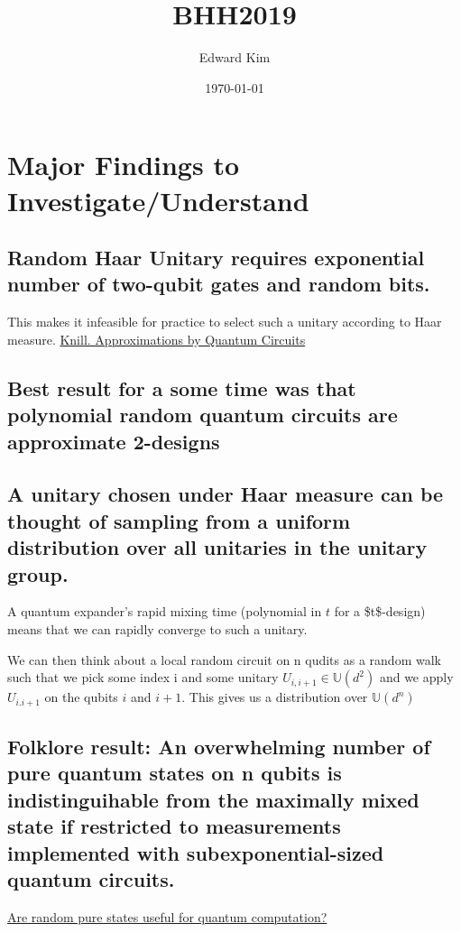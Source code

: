 \documentclass[11pt]{article}
\author{Edward Kim}
\date{\today}
\title{BHH2019}
\begin{document}
\maketitle
\tableofcontents


\section{Major Findings to Investigate/Understand}
\label{sec:org9e50a7b}
\subsection{Random Haar Unitary requires exponential number of two-qubit gates and random bits.}
\label{sec:org82a1496}
This makes it infeasible for practice to select such a unitary according to Haar measure.
\href{https://arxiv.org/pdf/quant-ph/9508006.pdf}{Knill. Approximations by Quantum Circuits}

\subsection{Best result for a some time was that polynomial random quantum circuits are approximate 2-designs}
\label{sec:orge6ed15b}
\subsection{A unitary chosen under Haar measure can be thought of sampling from a uniform distribution over all unitaries in the unitary group.}
\label{sec:org549b286}
A quantum expander's rapid mixing time (polynomial in \(t\) for a \$t\$-design) means that we can rapidly converge to such a unitary.

We can then think about a local random circuit on n qudits as a random walk such that we pick some index i and some unitary \(U_{i,i+1} \in \mathbb{U}(d^2)\) and we apply \(U_{i.i+1}\) on the qubits \(i\) and \(i+1\). This gives us a distribution over \(\mathbb{U}(d^n)\)

\subsection{Folklore result: An overwhelming number of pure quantum states on n qubits is indistinguihable from the maximally mixed state if restricted to measurements implemented with subexponential-sized quantum circuits.}
\label{sec:orga3a6da1}
\href{https://arxiv.org/pdf/0812.3001.pdf}{Are random pure states useful for quantum computation?}
\end{document}
